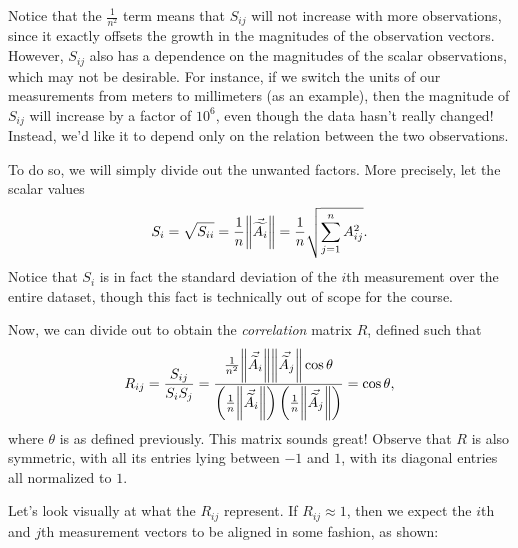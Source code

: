 \documentclass[letterpaper]{article}
\theoremstyle{remark}
\renewcommand{\tilde}[1]{\widetilde{#1}}
\begin{document}
Notice that the $\frac{1}{n^2}$ term means that $S_{ij}$ will not increase with more observations, since it exactly offsets the growth in the magnitudes of the observation vectors. However, $S_{ij}$ also has a dependence on the magnitudes of the scalar observations, which may not be desirable. For instance, if we switch the units of our measurements from meters to millimeters (as an example), then the magnitude of $S_{ij}$ will increase by a factor of $10^6$, even though the data hasn't really changed! Instead, we'd like it to depend only on the relation between the two observations. 

To do so, we will simply divide out the unwanted factors. More precisely, let the scalar values
\[
    S_i = \sqrt{S_{ii}} = \frac{1}{n}\norm{\vec{\tilde{A_i}}} = \frac{1}{n}\sqrt{\sum_{j=1}^nA_{ij}^2}.
\]
Notice that $S_i$ is in fact the standard deviation of the $i$th measurement over the entire dataset, though this fact is technically out of scope for the course.

Now, we can divide out to obtain the \emph{correlation} matrix $R$, defined such that
\[
    R_{ij} = \frac{S_{ij}}{S_iS_j} = \frac{\frac{1}{n^2}\norm{\vec{\tilde{A}_i}}\norm{\vec{\tilde{A}_j}}\cos{\theta}}{\left(\frac{1}{n}\norm{\vec{\tilde{A}_i}}\right)\left(\frac{1}{n}\norm{\vec{\tilde{A}_j}}\right)} = \cos{\theta},
\]
where $\theta$ is as defined previously. This matrix sounds great! Observe that $R$ is also symmetric, with all its entries lying between $-1$ and $1$, with its diagonal entries all normalized to $1$. 

Let's look visually at what the $R_{ij}$ represent. If $R_{ij} \approx 1$, then we expect the $i$th and $j$th measurement vectors to be aligned in some fashion, as shown:
\begin{center}
\end{center}
\end{document}
